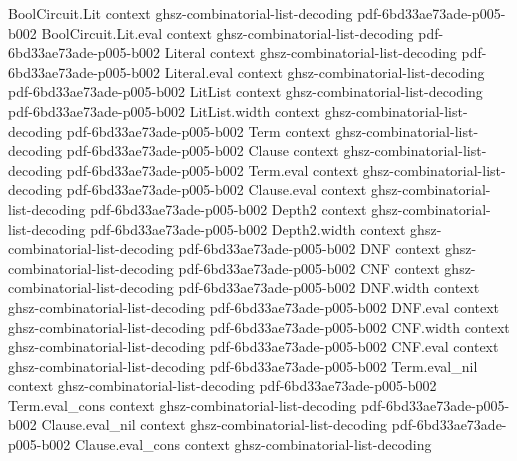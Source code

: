 \begin{lemma}
\label{BooleanAnalysis.sum_chiS}
\leanok
{}
\proofstep
  {BoolCircuit.Lit}
  {context}
  {ghsz-combinatorial-list-decoding}
  {pdf-6bd33ae73ade-p005-b002}
\proofstep
  {BoolCircuit.Lit.eval}
  {context}
  {ghsz-combinatorial-list-decoding}
  {pdf-6bd33ae73ade-p005-b002}
\proofstep
  {Literal}
  {context}
  {ghsz-combinatorial-list-decoding}
  {pdf-6bd33ae73ade-p005-b002}
\proofstep
  {Literal.eval}
  {context}
  {ghsz-combinatorial-list-decoding}
  {pdf-6bd33ae73ade-p005-b002}
\proofstep
  {LitList}
  {context}
  {ghsz-combinatorial-list-decoding}
  {pdf-6bd33ae73ade-p005-b002}
\proofstep
  {LitList.width}
  {context}
  {ghsz-combinatorial-list-decoding}
  {pdf-6bd33ae73ade-p005-b002}
\proofstep
  {Term}
  {context}
  {ghsz-combinatorial-list-decoding}
  {pdf-6bd33ae73ade-p005-b002}
\proofstep
  {Clause}
  {context}
  {ghsz-combinatorial-list-decoding}
  {pdf-6bd33ae73ade-p005-b002}
\proofstep
  {Term.eval}
  {context}
  {ghsz-combinatorial-list-decoding}
  {pdf-6bd33ae73ade-p005-b002}
\proofstep
  {Clause.eval}
  {context}
  {ghsz-combinatorial-list-decoding}
  {pdf-6bd33ae73ade-p005-b002}
\proofstep
  {Depth2}
  {context}
  {ghsz-combinatorial-list-decoding}
  {pdf-6bd33ae73ade-p005-b002}
\proofstep
  {Depth2.width}
  {context}
  {ghsz-combinatorial-list-decoding}
  {pdf-6bd33ae73ade-p005-b002}
\proofstep
  {DNF}
  {context}
  {ghsz-combinatorial-list-decoding}
  {pdf-6bd33ae73ade-p005-b002}
\proofstep
  {CNF}
  {context}
  {ghsz-combinatorial-list-decoding}
  {pdf-6bd33ae73ade-p005-b002}
\proofstep
  {DNF.width}
  {context}
  {ghsz-combinatorial-list-decoding}
  {pdf-6bd33ae73ade-p005-b002}
\proofstep
  {DNF.eval}
  {context}
  {ghsz-combinatorial-list-decoding}
  {pdf-6bd33ae73ade-p005-b002}
\proofstep
  {CNF.width}
  {context}
  {ghsz-combinatorial-list-decoding}
  {pdf-6bd33ae73ade-p005-b002}
\proofstep
  {CNF.eval}
  {context}
  {ghsz-combinatorial-list-decoding}
  {pdf-6bd33ae73ade-p005-b002}
\proofstep
  {Term.eval_nil}
  {context}
  {ghsz-combinatorial-list-decoding}
  {pdf-6bd33ae73ade-p005-b002}
\proofstep
  {Term.eval_cons}
  {context}
  {ghsz-combinatorial-list-decoding}
  {pdf-6bd33ae73ade-p005-b002}
\proofstep
  {Clause.eval_nil}
  {context}
  {ghsz-combinatorial-list-decoding}
  {pdf-6bd33ae73ade-p005-b002}
\proofstep
  {Clause.eval_cons}
  {context}
  {ghsz-combinatorial-list-decoding}

\end{lemma}
